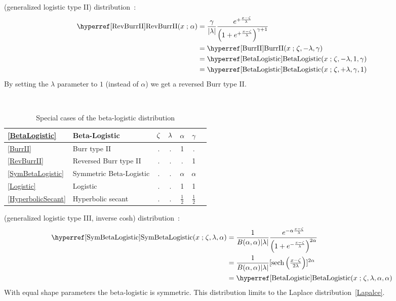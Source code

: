  (generalized logistic type II) distribution~\cite{Johnson1994}:
\begin{align}
\label{RevBurrII}
\opr{RevBurrII}(x\given \alpha) 
& = \frac{\gamma}{|\pScale|}   \frac{e^{+ \frac{x-\pLoc}{\pScale} } } { \left(1 + e^{+\frac{x-\pLoc}{\pScale}  }\right)^{\gamma+1} }
\checked
\\
& = \opr{BurrII}(x\given \pLoc, -\pScale,  \gamma) \notag \checked \\
& = \opr{BetaLogistic}(x\given \pLoc, -\pScale, 1, \gamma) \notag \checked \\
& = \opr{BetaLogistic}(x\given \pLoc, +\pScale, \gamma, 1)  \notag \checked
\notag
\end{align}
By setting the $\lambda$ parameter to $1$ (instead of $\alpha$) we get a reversed Burr type II.


\begin{table*}[ptb]
\begin{center}
\caption[Beta-logistic distribution -- Special cases]{Special cases of the beta-logistic distribution}
~\\
{\renewcommand{\arraystretch}{1.25} 
\begin{tabular}{llccccl}
\eqref{BetaLogistic} & Beta-Logistic & $\zeta$ & $\lambda$ & $\alpha$ &  $\gamma$ \\
\hline  
\eqref{BurrII} & Burr type II					&. & . & 1 & . & \\
\eqref{RevBurrII}& Reversed Burr type II		&	. & . & . & 1 &\\
\eqref{SymBetaLogistic}& Symmetric Beta-Logistic		&	. &   . & $\alpha$ & $\alpha$ & \\
\eqref{Logistic}& Logistic					& 	. & . & 1 & 1 & \\
\eqref{HyperbolicSecant}& Hyperbolic secant	&	. & . & $\tfrac{1}{2}$ & $\tfrac{1}{2}$ & \\
\end{tabular}
}
\end{center}
\end{table*}





 (generalized logistic type III, inverse cosh) distribution~\cite{Johnson1995}:
\begin{align}
\label{SymBetaLogistic}
\opr{SymBetaLogistic}(x\given \pLoc,\pScale,\alpha) 
& =
\frac{1}{B(\alpha, \alpha) |\pScale|}
 \frac{e^{-\alpha \frac{x-\pLoc}{\pScale} }} { \left(1 + e^{-\frac{x-\pLoc}{\pScale}  }\right)^{2\alpha} } \checked
  \\ \notag & = \frac{1}{B(\alpha, \alpha) |\pScale|} [\op{sech} \left(\tfrac{x-\pLoc}{2\pScale}  \right)]^{2\alpha}  
\\ \notag & = \opr{BetaLogistic}(x\given \pLoc,\pScale,\alpha,\alpha) \checked
\end{align}
With equal shape parameters the  beta-logistic is symmetric. This distribution limits to the Laplace distribution~\eqref{Lapalce}.


